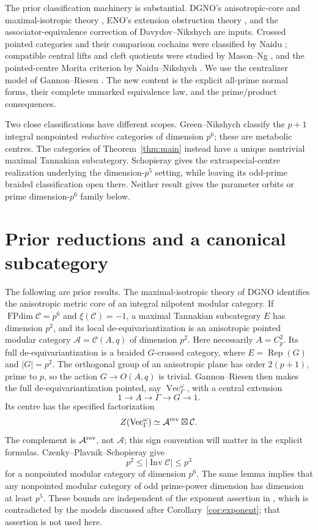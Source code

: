 \documentclass[11pt]{amsart}
\theoremstyle{definition}\newtheorem{definition}[theorem]{Definition}
\renewcommand{\Vec}{\operatorname{Vec}}
\newcommand{\Rep}{\operatorname{Rep}}
\newcommand{\FPdim}{\operatorname{FPdim}}
\newcommand{\Inv}{\operatorname{Inv}}
\newcommand{\cC}{\mathcal C}
\newcommand{\cA}{\mathcal A}
\begin{document}
The prior classification machinery is substantial. DGNO's anisotropic-core
and maximal-isotropic theory \cite{DGNO}, ENO's extension obstruction theory
\cite{ENO}, and the associator-equivalence correction of Davydov--Nikshych
\cite{DN} are inputs. Crossed pointed categories and their comparison cochains
were classified by Naidu \cite{Naidu}; compatible central lifts and cleft
quotients were studied by Mason--Ng \cite{MN}, and the pointed-centre Morita
criterion by Naidu--Nikshych \cite{NN}. We use the centralizer model of
Gannon--Riesen \cite{GR}. The new content is the explicit all-prime normal forms,
their complete unmarked equivalence law, and the prime/product consequences.

Two close classifications have different scopes. Green--Nikshych
\cite[Section 7.1, Proposition 7.6]{GN} classify the $p+1$ integral nonpointed
\emph{reductive} categories of dimension $p^6$; these are metabolic centres.
The categories of Theorem~\ref{thm:main} instead have a unique nontrivial maximal
Tannakian subcategory. Schopieray \cite[Section 6]{Schopieray} gives the
extraspecial-centre realization underlying the dimension-$p^5$ setting, while
leaving its odd-prime braided classification open there. Neither result gives
the parameter orbits or prime dimension-$p^6$ family below.

\section{Prior reductions and a canonical subcategory}
The following are prior results. The maximal-isotropic theory of DGNO
\cite{DGNO} identifies the anisotropic metric core of an integral nilpotent
modular category. If $\FPdim\cC=p^6$ and $\xi(\cC)=-1$, a maximal Tannakian
subcategory $E$ has dimension $p^2$, and its local de-equivariantization is an
anisotropic pointed modular category $\cA=\cC(A,q)$ of dimension $p^2$.
Here necessarily $A=C_p^2$. Its full de-equivariantization is a braided
$G$-crossed category, where $E=\Rep(G)$ and $|G|=p^2$.
The orthogonal group of an anisotropic plane has order $2(p+1)$, prime to $p$,
so the action $G\to O(A,q)$ is trivial.
Gannon--Riesen \cite[Theorem 4.1]{GR} then makes the full de-equivariantization
pointed, say $\Vec_\Gamma^\omega$, with a central extension
\[
1\longrightarrow A\longrightarrow\Gamma\longrightarrow G\longrightarrow1.
\]
Its centre has the specified factorization
\begin{equation}\label{eq:stabilize}
Z(\Vec_\Gamma^\omega)\simeq\cA^{\rm rev}\boxtimes\cC.
\end{equation}
The complement is $\cA^{\rm rev}$, not $\cA$; this sign convention will matter
in the explicit formulas.
Czenky--Plavnik--Schopieray \cite[Lemma 2]{CPS} give
\begin{equation}\label{eq:invbound}
p^2\leq |\Inv\cC|\leq p^3
\end{equation}
for a nonpointed modular category of dimension $p^6$. The same lemma implies
that any nonpointed modular category of odd prime-power dimension has dimension
at least $p^5$. These bounds are independent of the exponent assertion in
\cite[Proposition 2]{CPS}, which is contradicted by the models discussed after
Corollary~\ref{cor:exponent}; that assertion is not used here.
\end{document}
